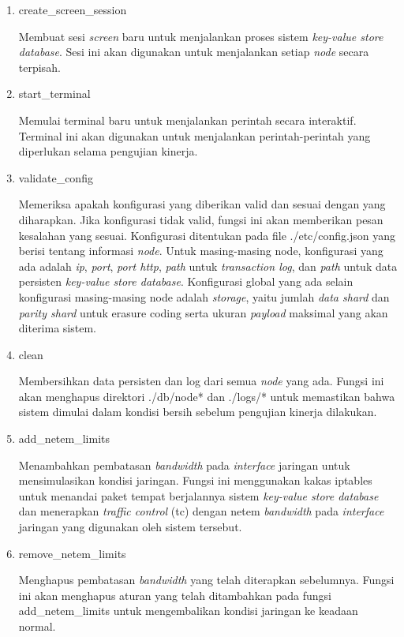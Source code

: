 \begin{enumerate}
  \item create\_screen\_session

  Membuat sesi \textit{screen} baru untuk menjalankan proses sistem \textit{key-value store database}. Sesi ini akan digunakan untuk menjalankan setiap \textit{node} secara terpisah.

  \item start\_terminal

  Memulai terminal baru untuk menjalankan perintah secara interaktif. Terminal ini akan digunakan untuk menjalankan perintah-perintah yang diperlukan selama pengujian kinerja.

  \item validate\_config

  Memeriksa apakah konfigurasi yang diberikan valid dan sesuai dengan yang diharapkan. Jika konfigurasi tidak valid, fungsi ini akan memberikan pesan kesalahan yang sesuai. Konfigurasi ditentukan pada file ./etc/config.json yang berisi tentang informasi \textit{node}. Untuk masing-masing node, konfigurasi yang ada adalah \textit{ip}, \textit{port}, \textit{port http}, \textit{path} untuk \textit{transaction log}, dan \textit{path} untuk data persisten \textit{key-value store database}. Konfigurasi global yang ada selain konfigurasi masing-masing node adalah \textit{storage}, yaitu jumlah \textit{data shard} dan \textit{parity shard} untuk erasure coding serta ukuran \textit{payload} maksimal yang akan diterima sistem.

  \item clean

  Membersihkan data persisten dan log dari semua \textit{node} yang ada. Fungsi ini akan menghapus direktori ./db/node* dan ./logs/* untuk memastikan bahwa sistem dimulai dalam kondisi bersih sebelum pengujian kinerja dilakukan.

  \item add\_netem\_limits

  Menambahkan pembatasan \textit{bandwidth} pada \textit{interface} jaringan untuk mensimulasikan kondisi jaringan. Fungsi ini menggunakan kakas iptables untuk menandai paket tempat berjalannya sistem \textit{key-value store database} dan menerapkan \textit{traffic control} (tc) dengan netem \textit{bandwidth} pada \textit{interface} jaringan yang digunakan oleh sistem tersebut.

  \item remove\_netem\_limits
  
  Menghapus pembatasan \textit{bandwidth} yang telah diterapkan sebelumnya. Fungsi ini akan menghapus aturan yang telah ditambahkan pada fungsi add\_netem\_limits untuk mengembalikan kondisi jaringan ke keadaan normal.
  
\end{enumerate}

